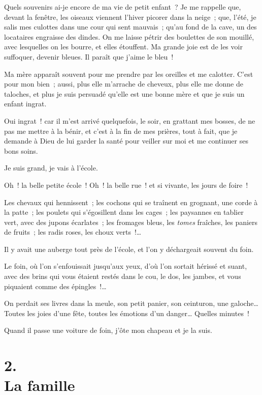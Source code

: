 \documentclass[french,twoside]{book} %
\begin{document}
\bigbreak
\noindent Quels souvenirs ai-je encore de ma vie de petit enfant ? Je me rappelle que, devant la fenêtre, les oiseaux viennent l’hiver picorer dans la neige ; que, l’été, je salis mes culottes dans une cour qui sent mauvais ; qu’au fond de la cave, un des locataires engraisse des dindes. On me laisse pétrir des boulettes de son mouillé, avec lesquelles on les bourre, et elles étouffent. Ma grande joie est de les voir suffoquer, devenir bleues. Il paraît que j’aime le bleu !\par
Ma mère apparaît souvent pour me prendre par les oreilles et me calotter. C’est pour mon bien ; aussi, plus elle m’arrache de cheveux, plus elle me donne de taloches, et plus je suis persuadé qu’elle est une bonne mère et que je suis un enfant ingrat.\par
Oui ingrat ! car il m’est arrivé quelquefois, le soir, en grattant mes bosses, de ne pas me mettre à la bénir, et c’est à la fin de mes prières, tout à fait, que je demande à Dieu de lui garder la santé pour veiller sur moi et me continuer ses bons soins.\par
\bigbreak
\noindent Je suis grand, je vais à l’école.\par
Oh ! la belle petite école ! Oh ! la belle rue ! et si vivante, les jours de foire !\par
Les chevaux qui hennissent ; les cochons qui se traînent en grognant, une corde à la patte ; les poulets qui s’égosillent dans les cages ; les paysannes en tablier vert, avec des jupons écarlates ; les fromages bleus, les \emph{tomes} fraîches, les paniers de fruits ; les radis roses, les choux verts !…\par
Il y avait une auberge tout près de l’école, et l’on y déchargeait souvent du foin.\par
Le foin, où l’on s’enfouissait jusqu’aux yeux, d’où l’on sortait hérissé et suant, avec des brins qui vous étaient restés dans le cou, le dos, les jambes, et vous piquaient comme des épingles !…\par
On perdait ses livres dans la meule, son petit panier, son ceinturon, une galoche… Toutes les joies d’une fête, toutes les émotions d’un danger… Quelles minutes !\par
Quand il passe une voiture de foin, j’ôte mon chapeau et je la suis.
\section[{2. La famille}]{2. \\
La famille}\renewcommand{\leftmark}{2. \\
La famille}
\end{document}
